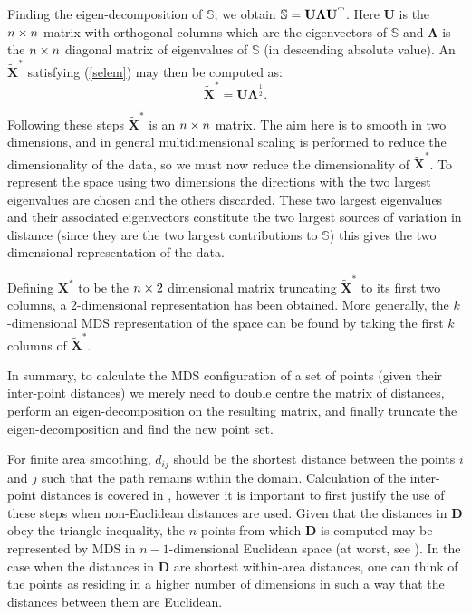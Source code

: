 Finding the eigen-decomposition of $\mathbb{S}$, we obtain $\mathbb{S}=\mathbf{U}\mathbf{\Lambda}\mathbf{U}^{\text{T}}$. Here $\mathbf{U}$ is the $n \times n$ matrix with orthogonal columns which are the eigenvectors of $\mathbb{S}$ and $\mathbf{\Lambda}$ is the $n \times n$ diagonal matrix of eigenvalues of $\mathbb{S}$ (in descending absolute value). An $\tilde{\mathbf{X}}^*$ satisfying (\ref{selem}) may then be computed as:
\begin{equation}
\tilde{\mathbf{X}}^*=\mathbf{U}\mathbf{\Lambda}^{\frac{1}{2}}.
\end{equation}

Following these steps $\tilde{\mathbf{X}}^*$ is an $n \times n$ matrix. The aim here is to smooth in two dimensions, and in general multidimensional scaling is performed to reduce the dimensionality of the data, so we must now reduce the dimensionality of $\tilde{\mathbf{X}}^*$. To represent the space using two dimensions the directions with the two largest eigenvalues are chosen and the others discarded. These two largest eigenvalues and their associated eigenvectors constitute the two largest sources of variation in distance (since they are the two largest contributions to $\mathbb{S}$) this gives the two dimensional representation of the data. 

Defining $\mathbf{X}^*$ to be the $n \times 2$ dimensional matrix truncating $\tilde{\mathbf{X}}^*$ to its first two columns, a 2-dimensional representation has been obtained. More generally, the $k$-dimensional MDS representation of the space can be found by taking the first $k$ columns of $\tilde{\mathbf{X}}^*$.

In summary, to calculate the MDS configuration of a set of points (given their inter-point distances) we merely need to double centre the matrix of distances, perform an eigen-decomposition on the resulting matrix, and finally truncate the eigen-decomposition and find the new point set.

For finite area smoothing, $d_{ij}$ should be the shortest distance between the points $i$ and $j$ such that the path remains within the domain. Calculation of the inter-point distances is covered in , however it is important to first justify the use of these steps when non-Euclidean distances are used. Given that the distances in $\mathbf{D}$ obey the triangle inequality, the $n$ points from which $\mathbf{D}$ is computed may be represented by MDS in $n-1$-dimensional Euclidean space (at worst, see \cite{gower1968}). In the case when the distances in $\mathbf{D}$ are shortest within-area distances, one can think of the points as residing in a higher number of dimensions in such a way that the distances between them are Euclidean.

